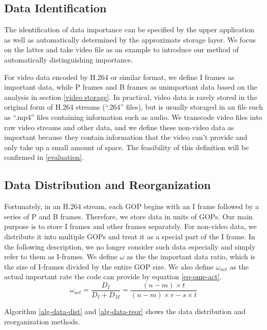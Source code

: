 \documentclass[sigconf]{acmart}
\begin{document}
\subsection{Data Identification}
The identification of data importance can be specified by the upper application as well as automatically determined by the approximate storage layer. We focus on the latter and take video file as an example to introduce our method of automatically distinguishing importance.

For video data encoded by H.264 or similar format, we define I frames as important data, while P frames and B frames as unimportant data based on the analysis in section \ref{video storage}. In practical, video data is rarely stored in the original form of H.264 streams (``.264'' files), but is usually storaged in an file such as ``.mp4'' files containing information such as audio. We transcode video files into raw video streams and other data, and we define these non-video data as important because they contain information that the video can't provide and only take up a small amount of space. The feasibility of this definition will be confirmed in \ref{evaluation}.

\subsection{Data Distribution and Reorganization}
Fortunately, in an H.264 stream, each GOP begins with an I frame followed by a series of P and B frames. Therefore, we store data in units of GOPs. Our main purpose is to store I frames and other frames separately. For non-video data, we distribute it into multiple GOPs and treat it as a special part of the I frame. In the following description, we no longer consider such data especially and simply refer to them as I-frames.
We define $\omega$ as the the important data ratio, which is the size of I-frames divided by the entire GOP size. We also define $\omega_{act}$ as the actual important rate the code can provide by equation \ref{eq-ome-act}.
\begin{equation}\label{eq-ome-act}
    \omega_{act}=\frac{D_I}{D_I+D_M}=\frac{(n-m) \times t}{(n-m) \times r-s \times t}
\end{equation}

  Algorithm \ref{alg-data-dist} and \ref{alg-data-reor} shows the data distribution and reorganization methods.
\end{document}
